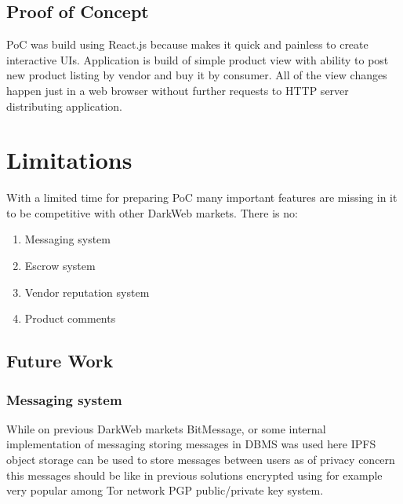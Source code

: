 \documentclass[journal]{IEEEtran} %
\begin{document}
    \subsection{Proof of Concept}
        PoC was build using React.js because makes it quick and painless to create interactive UIs. Application is build of simple product view with ability to post new product listing by vendor and buy it by consumer. All of the view changes happen just in a web browser without further requests to HTTP server distributing application.

\section{Limitations}
    With a limited time for preparing PoC many important features are missing in it to be competitive with other DarkWeb markets. There is no:
    \begin{enumerate}
        \item Messaging system
        \item Escrow system
        \item Vendor reputation system
        \item Product comments
    \end{enumerate}
    
    \subsection{Future Work}
        \subsubsection{Messaging system}
            While on previous DarkWeb markets BitMessage, or some internal implementation of messaging storing messages in DBMS was used here IPFS object storage can be used to store messages between users as of privacy concern this messages should be like in previous solutions encrypted using for example very popular among Tor network PGP public/private key system.\\
            
\end{document}

